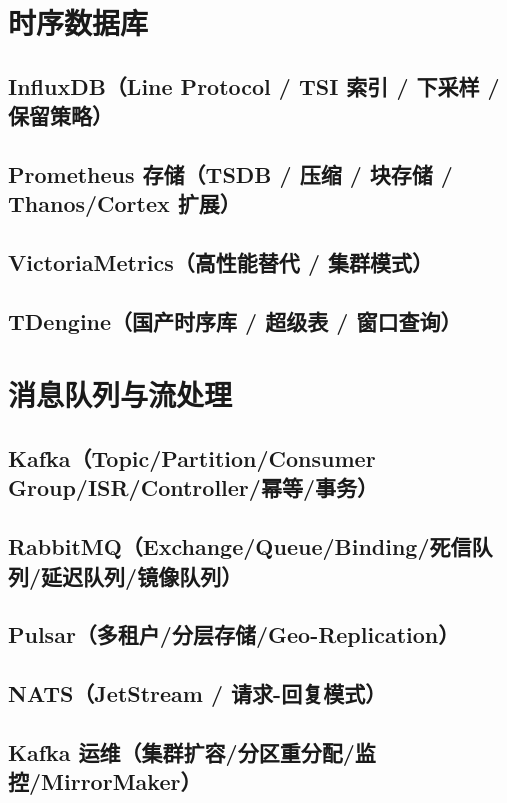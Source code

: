\documentclass[12pt,UTF8]{ctexbook}
\begin{document}
\chapter{时序数据库}
\label{chap:tsdb}

  \section{InfluxDB（Line Protocol / TSI 索引 / 下采样 / 保留策略）}
  \section{Prometheus 存储（TSDB / 压缩 / 块存储 / Thanos/Cortex 扩展）}
  \section{VictoriaMetrics（高性能替代 / 集群模式）}
  \section{TDengine（国产时序库 / 超级表 / 窗口查询）}

\chapter{消息队列与流处理}
\label{chap:mq-streaming}

  \section{Kafka（Topic/Partition/Consumer Group/ISR/Controller/幂等/事务）}
  \section{RabbitMQ（Exchange/Queue/Binding/死信队列/延迟队列/镜像队列）}
  \section{Pulsar（多租户/分层存储/Geo-Replication）}
  \section{NATS（JetStream / 请求-回复模式）}
  \section{Kafka 运维（集群扩容/分区重分配/监控/MirrorMaker）}
\end{document}
